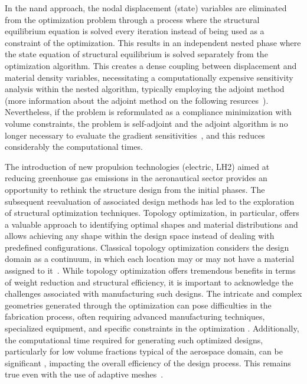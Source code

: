 In the \acrfull{nand} approach, the nodal displacement (state) variables are eliminated from the optimization problem through a process where the structural equilibrium equation is solved every iteration instead of being used as a constraint of the optimization. This results in an independent nested phase where the state equation of structural equilibrium is solved separately from the optimization algorithm. This creates a dense coupling between displacement and material density variables, necessitating a computationally expensive sensitivity analysis within the nested algorithm, typically employing the adjoint method (more information about the adjoint method on the following resurces~). Nevertheless, if the problem is reformulated as a compliance minimization with volume constraints, the problem is self-adjoint and the adjoint algorithm is no longer necessary to evaluate the gradient sensitivities~, and this reduces considerably the computational times.

The introduction of new propulsion technologies (electric, LH2) aimed at reducing greenhouse gas emissions in the aeronautical sector provides an opportunity to rethink the structure design from the initial phases. The subsequent reevaluation of associated design methods has led to the exploration of structural optimization techniques. Topology optimization, in particular, offers a valuable approach to identifying optimal shapes and material distributions and allows achieving any shape within the design space instead of dealing with predefined configurations. Classical topology optimization considers the design domain as a continuum, in which each location may or may not have a material assigned to it~\cite{bendsoe_optimal_1989}. While topology optimization offers tremendous benefits in terms of weight reduction and structural efficiency, it is important to acknowledge the challenges associated with manufacturing such designs. The intricate and complex geometries generated through the optimization can pose difficulties in the fabrication process, often requiring advanced manufacturing techniques, specialized equipment, and specific constraints in the optimization \cite{zhou_progress_2002,brackett_topology_2011,liu_current_2018}. Additionally, the computational time required for generating such optimized designs, particularly for low volume fractions typical of the aerospace domain, can be significant \cite{aage_giga-voxel_2017}, impacting the overall efficiency of the design process. This remains true even with the use of adaptive meshes~\cite{salazar_de_troya_adaptive_2018, zhang_adaptive_2020}.

